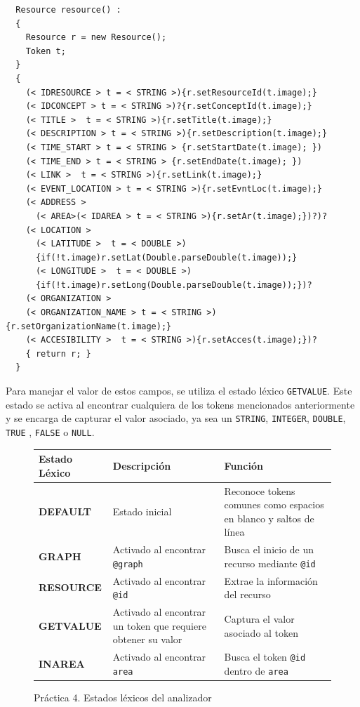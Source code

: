 \begin{lstlisting}
  Resource resource() :
  {
    Resource r = new Resource();
    Token t;
  }
  {
    (< IDRESOURCE > t = < STRING >){r.setResourceId(t.image);}
    (< IDCONCEPT > t = < STRING >)?{r.setConceptId(t.image);}  
    (< TITLE >  t = < STRING >){r.setTitle(t.image);}
    (< DESCRIPTION > t = < STRING >){r.setDescription(t.image);}
    (< TIME_START > t = < STRING > {r.setStartDate(t.image); })
    (< TIME_END > t = < STRING > {r.setEndDate(t.image); })
    (< LINK >  t = < STRING >){r.setLink(t.image);}
    (< EVENT_LOCATION > t = < STRING >){r.setEvntLoc(t.image);}
    (< ADDRESS > 
      (< AREA>(< IDAREA > t = < STRING >){r.setAr(t.image);})?)?
    (< LOCATION >
      (< LATITUDE >  t = < DOUBLE >)
      {if(!t.image)r.setLat(Double.parseDouble(t.image));}
      (< LONGITUDE >  t = < DOUBLE >)
      {if(!t.image)r.setLong(Double.parseDouble(t.image));})?
    (< ORGANIZATION >
    (< ORGANIZATION_NAME > t = < STRING >){r.setOrganizationName(t.image);}
    (< ACCESIBILITY >  t = < STRING >){r.setAcces(t.image);})? 
    { return r; }
  }
\end{lstlisting}

Para manejar el valor de estos campos, se utiliza el estado léxico \lstinline|GETVALUE|. Este estado se activa al encontrar cualquiera de los tokens mencionados anteriormente y se encarga de capturar el valor asociado, ya sea un \lstinline|STRING|, \lstinline|INTEGER|, \lstinline|DOUBLE|, \lstinline|TRUE| , \lstinline|FALSE| o \lstinline|NULL|.

\begin{figure}[H]
  \centering
  \begin{tabularx}{\textwidth}{>{\bfseries}l X X}
  \toprule
  \textbf{Estado Léxico} & \textbf{Descripción} & \textbf{Función} \\
  \midrule
  DEFAULT & Estado inicial & Reconoce tokens comunes como espacios en blanco y saltos de línea \\
  \midrule
  GRAPH & Activado al encontrar \lstinline|@graph| & Busca el inicio de un recurso mediante \lstinline|@id| \\
  \midrule
  RESOURCE & Activado al encontrar \lstinline|@id| & Extrae la información del recurso \\
  \midrule
  GETVALUE & Activado al encontrar un token que requiere obtener su valor & Captura el valor asociado al token \\
  \midrule
  INAREA & Activado al encontrar \lstinline|area| & Busca el token \lstinline|@id| dentro de \lstinline|area| \\
  \bottomrule
  \end{tabularx}
  \caption{\label{fig:estadoslexicosp4}Práctica 4. Estados léxicos del analizador}
  \label{table:lexical_statesp4}
  \end{figure}

